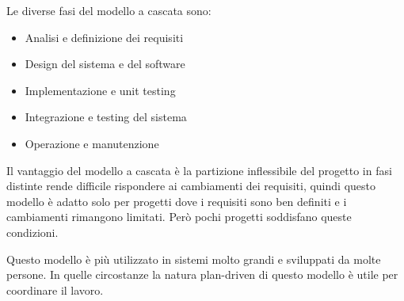 \documentclass[a4paper]{article}
\begin{document}
\noindent
Le diverse fasi del modello a cascata sono:
\begin{itemize}
  \item Analisi e definizione dei requisiti
  \item Design del sistema e del software
  \item Implementazione e unit testing
  \item Integrazione e testing del sistema
  \item Operazione e manutenzione
\end{itemize}

\noindent
Il vantaggio del modello a cascata è la partizione inflessibile del progetto in fasi 
distinte rende difficile rispondere ai cambiamenti dei requisiti, quindi questo modello 
è adatto solo per progetti dove i requisiti sono ben definiti e i cambiamenti rimangono 
limitati. Però pochi progetti soddisfano queste condizioni.

\vspace{1em}
\noindent
Questo modello è più utilizzato in sistemi molto grandi e sviluppati da molte persone.
In quelle circostanze la natura plan-driven di questo modello è utile per coordinare
il lavoro.
\end{document}
